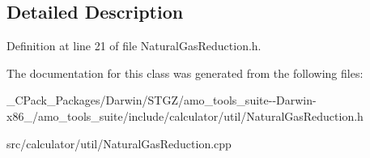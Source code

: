 \subsection{Detailed Description}


Definition at line 21 of file Natural\+Gas\+Reduction.\+h.



The documentation for this class was generated from the following files\+:\begin{DoxyCompactItemize}
\item 
\+\_\+\+C\+Pack\+\_\+\+Packages/\+Darwin/\+S\+T\+G\+Z/amo\+\_\+tools\+\_\+suite-\/-\/\+Darwin-\/x86\+\_/amo\+\_\+tools\+\_\+suite/include/calculator/util/Natural\+Gas\+Reduction.\+h\item 
src/calculator/util/Natural\+Gas\+Reduction.\+cpp\end{DoxyCompactItemize}

